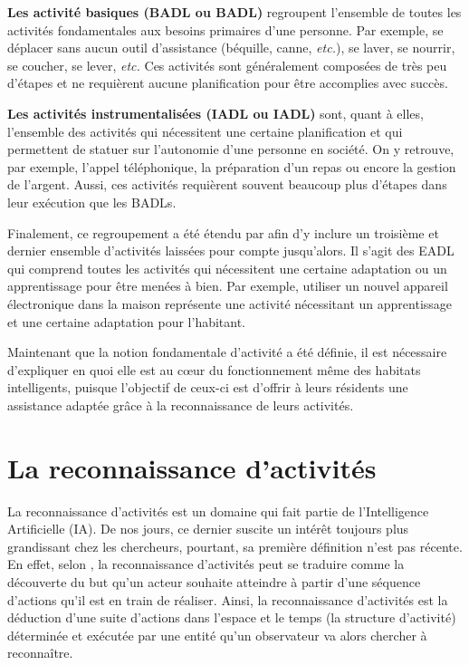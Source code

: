 {\textbf{Les activité basiques (\acl{BADL} ou \acs{BADL})} regroupent l'ensemble de toutes les activités fondamentales aux besoins primaires d'une personne. Par exemple, se déplacer sans aucun outil d'assistance (béquille, canne, \textit{etc.}), se laver, se nourrir, se coucher, se lever, \textit{etc.} Ces activités sont généralement composées de très peu d'étapes et ne requièrent aucune planification pour être accomplies avec succès.

{\textbf{Les activités instrumentalisées (\acl{IADL} ou \acs{IADL})} sont, quant à elles, l'ensemble des activités qui nécessitent une certaine planification et qui permettent de statuer sur l'autonomie d'une personne en société. On y retrouve, par exemple, l'appel téléphonique, la préparation d'un repas ou encore la gestion de l'argent. Aussi, ces activités requièrent souvent beaucoup plus d'étapes dans leur exécution que les \acsp{BADL}.

Finalement, ce regroupement a été étendu par \cite{Rogers1998} afin d'y inclure un troisième et dernier ensemble d'activités laissées pour compte jusqu'alors. Il s'agit des \ac{EADL} qui comprend toutes les activités qui nécessitent une certaine adaptation ou un apprentissage pour être menées à bien. Par exemple, utiliser un nouvel appareil électronique dans la maison représente une activité nécessitant un apprentissage et une certaine adaptation pour l'habitant.

Maintenant que la notion fondamentale d'activité a été définie, il est nécessaire d'expliquer en quoi elle est au c\oe{}ur du fonctionnement même des habitats intelligents, puisque l'objectif de ceux-ci est d'offrir à leurs résidents une assistance adaptée grâce à la reconnaissance de leurs activités.

\section{La reconnaissance d'activités}

La reconnaissance d'activités est un domaine qui fait partie de l'Intelligence Artificielle (\acs{IA}). De nos jours, ce dernier suscite un intérêt toujours plus grandissant chez les chercheurs, pourtant, sa première définition n'est pas récente. En effet, selon \cite{Schmidt1978}, la reconnaissance d'activités peut se traduire comme la découverte du but qu'un acteur souhaite atteindre à partir d'une séquence d'actions qu'il est en train de réaliser. Ainsi, la reconnaissance d'activités est la déduction d'une suite d'actions dans l'espace et le temps (la structure d'activité) déterminée et exécutée par une entité qu'un observateur va alors chercher à reconnaître.

}}
